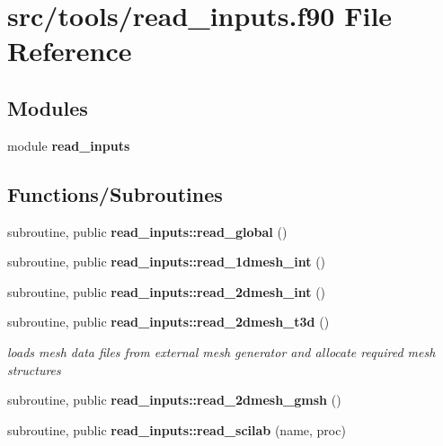 \section{src/tools/read\+\_\+inputs.f90 File Reference}
\label{read__inputs_8f90}
\subsection*{Modules}
\begin{DoxyCompactItemize}
\item 
module {\bf read\+\_\+inputs}
\end{DoxyCompactItemize}
\subsection*{Functions/\+Subroutines}
\begin{DoxyCompactItemize}
\item 
subroutine, public {\bf read\+\_\+inputs\+::read\+\_\+global} ()
\item 
subroutine, public {\bf read\+\_\+inputs\+::read\+\_\+1dmesh\+\_\+int} ()
\item 
subroutine, public {\bf read\+\_\+inputs\+::read\+\_\+2dmesh\+\_\+int} ()
\item 
subroutine, public {\bf read\+\_\+inputs\+::read\+\_\+2dmesh\+\_\+t3d} ()
\begin{DoxyCompactList}\small\item\em loads mesh data files from external mesh generator and allocate required mesh structures \end{DoxyCompactList}\item 
subroutine, public {\bf read\+\_\+inputs\+::read\+\_\+2dmesh\+\_\+gmsh} ()
\item 
subroutine, public {\bf read\+\_\+inputs\+::read\+\_\+scilab} (name, proc)
\end{DoxyCompactItemize}
